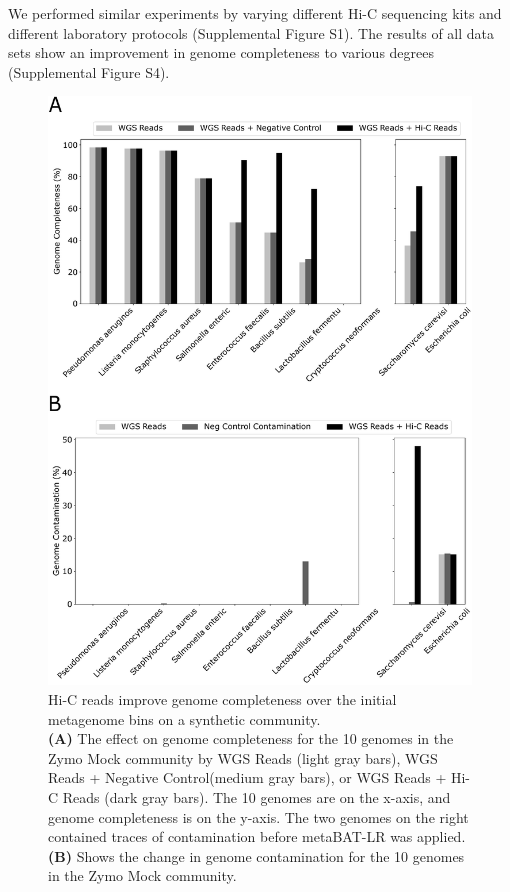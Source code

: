 \documentclass[fleqn,10pt,lineno]{wlpeerj}
\begin{document}
We performed similar experiments by varying different Hi-C sequencing kits and different laboratory protocols (Supplemental Figure S1). The results of all data sets show an improvement in genome completeness to various degrees (Supplemental Figure S4). 

  
\begin{figure}[ht!]
\centering
\includegraphics[scale=0.6]{Fig2.pdf}
\caption{Hi-C reads improve genome completeness over the initial metagenome bins on a synthetic community.
    \\\textbf{(A)} The effect on genome completeness for the 10 genomes in the Zymo Mock community by WGS Reads (light gray bars), WGS Reads + Negative Control(medium gray bars), or WGS Reads + Hi-C Reads (dark gray bars). The 10 genomes are on the x-axis, and genome completeness is on the y-axis. The two genomes on the right contained traces of contamination before metaBAT-LR was applied. \textbf{(B)} Shows the change in genome contamination for the 10 genomes in the Zymo Mock community.}
\label{fig:synthetic}
\end{figure}
\end{document}
